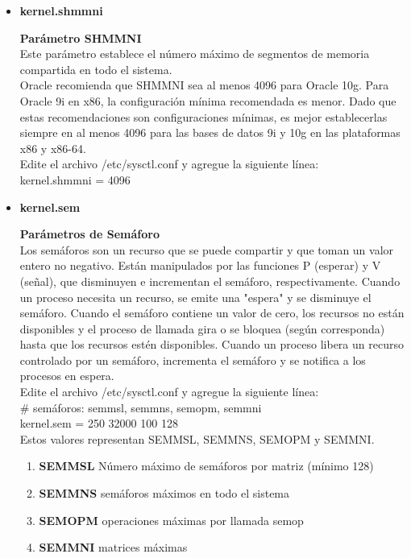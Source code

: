 \begin{itemize}
	\item \textbf{kernel.shmmni}


\begin{flushleft}
\textbf{Parámetro SHMMNI}\\
Este parámetro establece el número máximo de segmentos de memoria compartida en todo el sistema.\\
\vspace{5mm}
Oracle recomienda que SHMMNI sea al menos 4096 para Oracle 10g. Para Oracle 9i en x86, la configuración mínima recomendada es menor. Dado que estas recomendaciones son configuraciones mínimas, es mejor establecerlas siempre en al menos 4096 para las bases de datos 9i y 10g en las plataformas x86 y x86-64.\\
\vspace{5mm}
Edite el archivo /etc/sysctl.conf y agregue la siguiente línea:\\
kernel.shmmni = 4096\\
\end{flushleft}


	\item \textbf{kernel.sem}

\begin{flushleft}
\textbf{Parámetros de Semáforo}\\
Los semáforos son un recurso que se puede compartir y que toman un valor entero no negativo. Están manipulados por las funciones P (esperar) y V (señal), que disminuyen e incrementan el semáforo, respectivamente. Cuando un proceso necesita un recurso, se emite una "espera" y se disminuye el semáforo. Cuando el semáforo contiene un valor de cero, los recursos no están disponibles y el proceso de llamada gira o se bloquea (según corresponda) hasta que los recursos estén disponibles. Cuando un proceso libera un recurso controlado por un semáforo, incrementa el semáforo y se notifica a los procesos en espera.\\
\vspace{5mm}
Edite el archivo /etc/sysctl.conf y agregue la siguiente línea:\\
\# semáforos: semmsl, semmns, semopm, semmni\\
kernel.sem = 250 32000 100 128\\
\vspace{5mm}
Estos valores representan SEMMSL, SEMMNS, SEMOPM y SEMMNI.
\begin{enumerate}
\item \textbf{SEMMSL} Número máximo de semáforos por matriz (mínimo 128)
\item \textbf{SEMMNS} semáforos máximos en todo el sistema
\item \textbf{SEMOPM} operaciones máximas por llamada semop
\item \textbf{SEMMNI} matrices máximas
\end{enumerate}
\end{flushleft}



\end{itemize}

